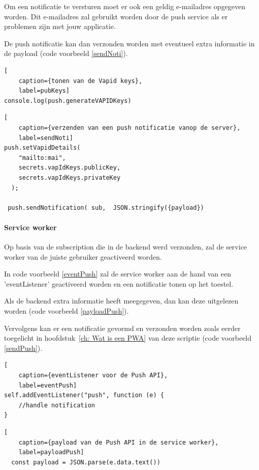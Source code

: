 			Om een notificatie te versturen moet er ook een geldig e-mailadres opgegeven worden. Dit e-mailadres zal gebruikt worden door de push service als er problemen zijn met jouw applicatie.
			
			De push notificatie kan dan verzonden worden met eventueel extra informatie in de payload (code voorbeeld \ref{sendNoti}).
			
\begin{lstlisting}[
	caption={tonen van de Vapid keys},
	label=pubKeys]
console.log(push.generateVAPIDKeys)
\end{lstlisting}

		

			
\begin{lstlisting}[
	caption={verzenden van een push notificatie vanop de server},
	label=sendNoti]
push.setVapidDetails(
    "mailto:mai",
    secrets.vapIdKeys.publicKey,
    secrets.vapIdKeys.privateKey
  );
  
 push.sendNotification( sub,  JSON.stringify({payload})
\end{lstlisting}

		
			
		\paragraph{Service worker}
		
			Op basis van de subscription die in de backend werd verzonden, zal de service worker van de juiste gebruiker geactiveerd worden.
			
			In code voorbeeld \ref{eventPush} zal de service worker aan de hand van een 'eventListener' geactiveerd worden en een notificatie tonen op het toestel.
			
			Als de backend extra informatie heeft meegegeven, dan kan deze uitgelezen worden (code voorbeeld \ref{payloadPush}).
			
			Vervolgens kan er een notificatie gevormd en verzonden worden zoals eerder toegelicht in hoofdstuk~\ref{ch: Wat is een PWA} van deze scriptie (code voorbeeld \ref{sendPush}).
							
\begin{lstlisting}[
	caption={eventListener voor de Push API},
	label=eventPush]
self.addEventListener("push", function (e) {
	//handle notification
}
\end{lstlisting}
			
		
\begin{lstlisting}[
	caption={payload van de Push API in de service worker},
	label=payloadPush]
  const payload = JSON.parse(e.data.text())
\end{lstlisting}
			
